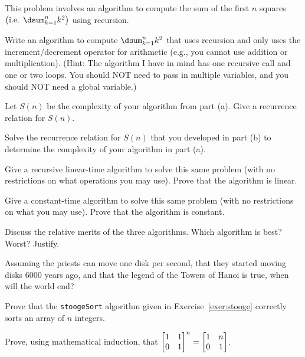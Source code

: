 \begin{pro}
This problem involves an algorithm to compute the sum of the first $n$ squares
$\left(\mbox{i.e. }\dsum_{k=1}^n k^2\right)$ using recursion.
\begin{lenum}
\item
Write an algorithm to compute $\dsum_{k=1}^n k^2$ that uses recursion and
only uses the increment/decrement operator for arithmetic (e.g., you cannot use addition or multiplication).
(Hint:  The algorithm I have in mind has one recursive call and one or two loops. You should NOT need to 
pass in multiple variables, and you should NOT need a global variable.)
\item
Let $S(n)$ be the complexity of your algorithm from part (a).
Give a recurrence relation for $S(n)$.
\item
Solve the recurrence relation for $S(n)$ that you developed in part (b) to determine the complexity 
of your algorithm in part (a).
\item
Give a recursive linear-time algorithm to solve this same problem
(with no restrictions on what operations you may use).
Prove that the algorithm is linear.
\item
Give a constant-time algorithm to solve this same problem
(with no restrictions on what you may use).
Prove that the algorithm is constant.
\item
Discuss the relative merits of the three algorithms.  Which algorithm is best?
Worst?  Justify.
\end{lenum}
\end{pro}

\begin{pro}
Assuming the priests can move one disk per second, that they started moving disks
6000 years ago, and that the legend of the Towers of Hanoi is true, 
when will the world end?
\end{pro}

\begin{pro}
Prove that the \verb+stoogeSort+ algorithm given in
Exercise~\ref{exer:stooge} correctly sorts an array of $n$ integers.
\end{pro}



\begin{pro}
Prove, using mathematical induction, that $\begin{bmatrix}1 & 1
\cr 0 & 1 \cr
\end{bmatrix}^n=\begin{bmatrix}1 & n \cr 0 & 1 \cr
\end{bmatrix}$.
\end{pro}

